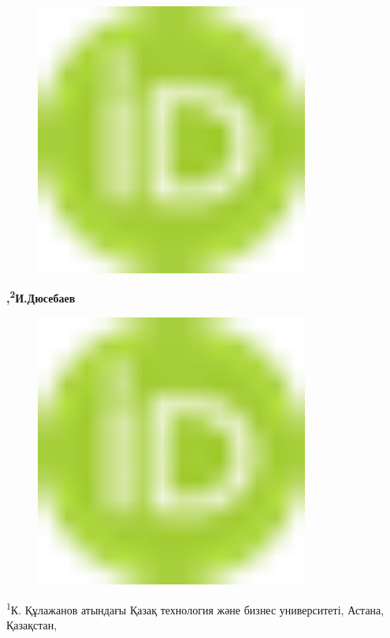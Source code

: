 \begin{figure}[H]
	\centering
	\includegraphics[width=0.8\textwidth]{media/ict2/image1}
	\caption*{}
\end{figure}
{\bfseries ,\textsuperscript{2}И.Дюсебаев}

\begin{figure}[H]
	\centering
	\includegraphics[width=0.8\textwidth]{media/ict2/image1}
	\caption*{}
\end{figure}


\textsuperscript{1}К. Құлажанов атындағы Қазақ технология және бизнес
университеті, Астана, Қазақстан,


